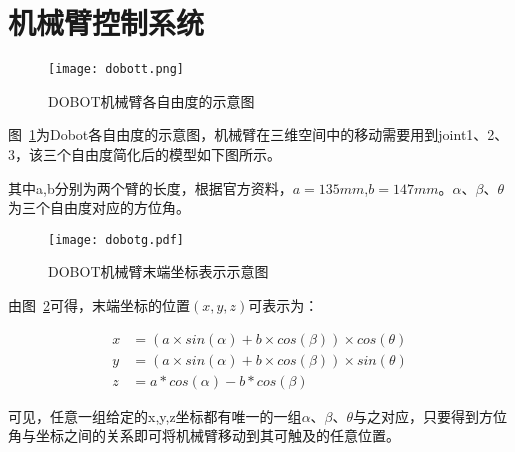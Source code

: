 \section{机械臂控制系统}

\begin{figure}[htbp]
\small
\centering
\texttt{[image: dobott.png]}
\caption{DOBOT机械臂各自由度的示意图} 
\label{dobott}
\end{figure}

图~\ref{dobott}为Dobot各自由度的示意图，机械臂在三维空间中的移动需要用到joint1、2、3，该三个自由度简化后的模型如下图所示。

其中a,b分别为两个臂的长度，根据官方资料，$a=135mm$,$b=147mm$。$\alpha$、$\beta$、$\theta$ 为三个自由度对应的方位角。

\begin{figure}[htbp]
\small
\centering
\texttt{[image: dobotg.pdf]}
\caption{DOBOT机械臂末端坐标表示示意图} 
\label{dobotg}
\end{figure}

由图~\ref{dobotg}可得，末端坐标的位置$(x,y,z)$可表示为：

\begin{align}
x&=(a \times sin(\alpha)+b \times cos(\beta))\times cos(\theta)\\
y&=(a \times sin(\alpha)+b \times cos(\beta)) \times sin(\theta)\\
z&=a*cos(\alpha)-b*cos(\beta)
\end{align}

可见，任意一组给定的x,y,z坐标都有唯一的一组$\alpha$、$\beta$、$\theta$与之对应，只要得到方位角与坐标之间的关系即可将机械臂移动到其可触及的任意位置。

